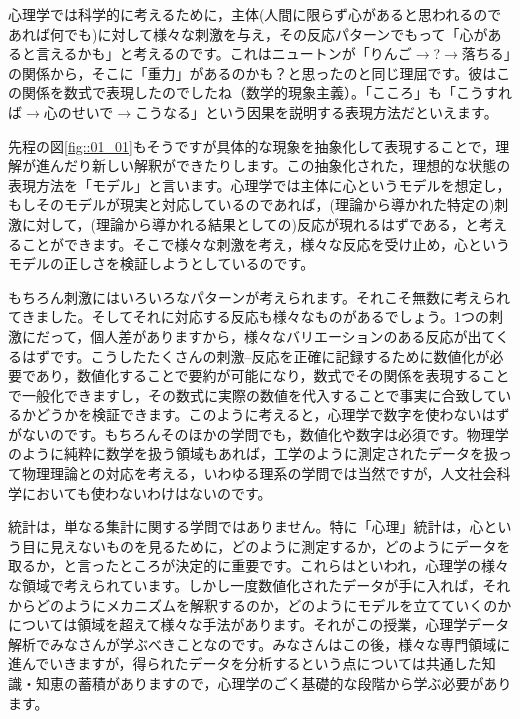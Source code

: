\documentclass{ltjsbook}
\begin{document}
心理学では科学的に考えるために，主体(人間に限らず心があると思われるのであれば何でも)に対して様々な刺激を与え，その反応パターンでもって「心があると言えるかも」と考えるのです。これはニュートンが「りんご$\to$?$\to$落ちる」の関係から，そこに「重力」があるのかも？と思ったのと同じ理屈です。彼はこの関係を数式で表現したのでしたね（数学的現象主義）。「こころ」も「こうすれば$\to$心のせいで$\to$こうなる」という因果を説明する表現方法だといえます。

先程の図\ref{fig::01_01}もそうですが具体的な現象を抽象化して表現することで，理解が進んだり新しい解釈ができたりします。この抽象化された，理想的な状態の表現方法を「モデル」と言います。心理学では主体に心というモデルを想定し，もしそのモデルが現実と対応しているのであれば，(理論から導かれた特定の)刺激に対して，(理論から導かれる結果としての)反応が現れるはずである，と考えることができます。そこで様々な刺激を考え，様々な反応を受け止め，心というモデルの正しさを検証しようとしているのです。

もちろん刺激にはいろいろなパターンが考えられます。それこそ無数に考えられてきました。そしてそれに対応する反応も様々なものがあるでしょう。1つの刺激にだって，個人差がありますから，様々なバリエーションのある反応が出てくるはずです。こうしたたくさんの刺激--反応を正確に記録するために数値化が必要であり，数値化することで要約が可能になり，数式でその関係を表現することで一般化できますし，その数式に実際の数値を代入することで事実に合致しているかどうかを検証できます。このように考えると，心理学で数字を使わないはずがないのです。もちろんそのほかの学問でも，数値化や数字は必須です。物理学のように純粋に数学を扱う領域もあれば，工学のように測定されたデータを扱って物理理論との対応を考える，いわゆる理系の学問では当然ですが，人文社会科学においても使わないわけはないのです。

統計は，単なる集計に関する学問ではありません。特に「心理」統計は，心という目に見えないものを見るために，どのように測定するか，どのようにデータを取るか，と言ったところが決定的に重要です。これらはといわれ，心理学の様々な領域で考えられています。しかし一度数値化されたデータが手に入れば，それからどのようにメカニズムを解釈するのか，どのようにモデルを立てていくのかについては領域を超えて様々な手法があります。それがこの授業，心理学データ解析でみなさんが学ぶべきことなのです。みなさんはこの後，様々な専門領域に進んでいきますが，得られたデータを分析するという点については共通した知識・知恵の蓄積がありますので，心理学のごく基礎的な段階から学ぶ必要があります。
\end{document}
